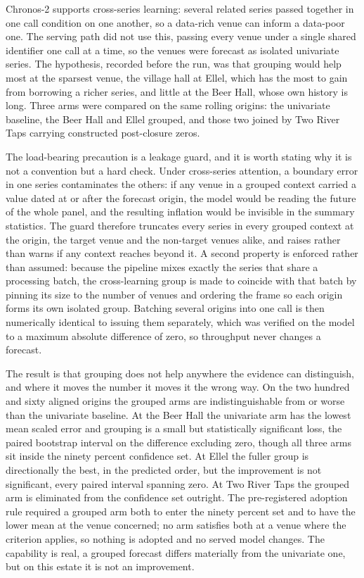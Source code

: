 Chronos-2 supports cross-series learning: several related series passed together in one call
condition on one another, so a data-rich venue can inform a data-poor one. The serving path
did not use this, passing every venue under a single shared identifier one call at a time, so
the venues were forecast as isolated univariate series. The hypothesis, recorded before the
run, was that grouping would help most at the sparsest venue, the village hall at Ellel, which
has the most to gain from borrowing a richer series, and little at the Beer Hall, whose own
history is long. Three arms were compared on the same rolling origins: the univariate baseline,
the Beer Hall and Ellel grouped, and those two joined by Two River Taps carrying constructed
post-closure zeros.

The load-bearing precaution is a leakage guard, and it is worth stating why it is not a
convention but a hard check. Under cross-series attention, a boundary error in one series
contaminates the others: if any venue in a grouped context carried a value dated at or after
the forecast origin, the model would be reading the future of the whole panel, and the
resulting inflation would be invisible in the summary statistics. The guard therefore truncates
every series in every grouped context at the origin, the target venue and the non-target venues
alike, and raises rather than warns if any context reaches beyond it. A second property is
enforced rather than assumed: because the pipeline mixes exactly the series that share a
processing batch, the cross-learning group is made to coincide with that batch by pinning its
size to the number of venues and ordering the frame so each origin forms its own isolated group.
Batching several origins into one call is then numerically identical to issuing them separately,
which was verified on the model to a maximum absolute difference of zero, so throughput never
changes a forecast.

The result is that grouping does not help anywhere the evidence can distinguish, and where it
moves the number it moves it the wrong way. On the two hundred and sixty aligned origins the
grouped arms are indistinguishable from or worse than the univariate baseline. At the Beer Hall
the univariate arm has the lowest mean scaled error and grouping is a small but statistically
significant loss, the paired bootstrap interval on the difference excluding zero, though all
three arms sit inside the ninety percent confidence set. At Ellel the fuller group is
directionally the best, in the predicted order, but the improvement is not significant, every
paired interval spanning zero. At Two River Taps the grouped arm is eliminated from the
confidence set outright. The pre-registered adoption rule required a grouped arm both to enter
the ninety percent set and to have the lower mean at the venue concerned; no arm satisfies both
at a venue where the criterion applies, so nothing is adopted and no served model changes. The
capability is real, a grouped forecast differs materially from the univariate one, but on this
estate it is not an improvement.

